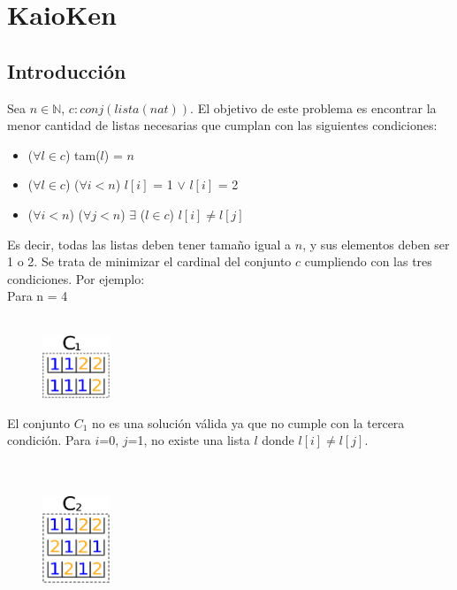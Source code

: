 \section{KaioKen}

	\subsection{Introducción}
		Sea $n \in \mathds{N}$, $c: conj(lista(nat))$. El objetivo de este problema es encontrar la menor cantidad de listas necesarias que cumplan con las siguientes condiciones: 
		    \begin{itemize}
                \item ($ \forall l \in c$) tam($l$) = $n$
                \item ($ \forall l \in c$) ($ \forall i < n$) $l[i]$ = 1 $\vee$ $l[i]$ = 2
                \item ($ \forall i < n$) ($ \forall j < n$) $\exists$ ($l \in c$) $l[i] \neq l[j]$
            \end{itemize}
    Es decir, todas las listas deben tener tamaño igual a $n$, y sus elementos deben ser 1 o 2. Se trata de minimizar el cardinal del conjunto $c$ cumpliendo con las tres condiciones. 
    Por ejemplo:\\
    
      Para n = 4  \\
    \\

\begin{figure}
  \vspace{-41pt}
  \begin{center}
    \includegraphics[width=2cm]{graficos/c1.png}
  \end{center}
\end{figure}

 El conjunto $C_{1}$ no es una solución válida ya que no cumple con la tercera condición. Para $i$=0, $j$=1, no existe una lista $l$ donde $l[i] \neq l[j]$.
\\
\\
\\

\begin{figure}
  \vspace{-41pt}
  \begin{center}
    \includegraphics[width=2cm]{graficos/c2.png}
  \end{center}
\end{figure}

